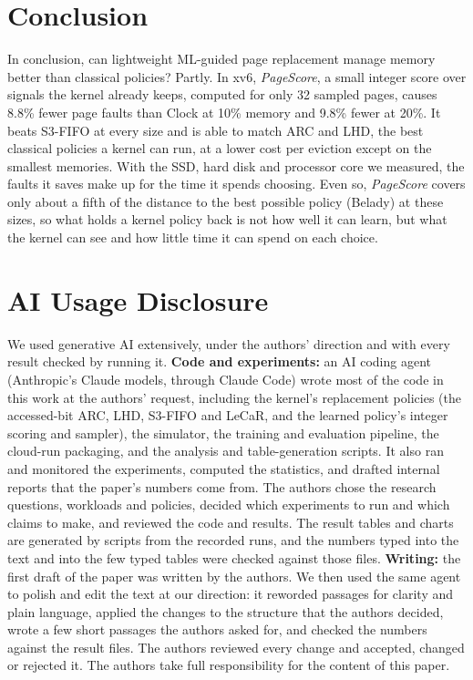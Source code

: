 \documentclass{article}
\newcommand{\clock}{Clock\xspace}
\newcommand{\belady}{Belady\xspace}
\DeclareRobustCommand{\pagescore}{\textit{PageScore}}
\begin{document}
\section{Conclusion}
\label{sec:conclusion}

In conclusion, can lightweight ML-guided page replacement manage memory better than classical policies? Partly. In xv6, \pagescore{}, a small integer score over signals the kernel already keeps, computed for only 32 sampled pages, causes 8.8\% fewer page faults than \clock at 10\% memory and 9.8\% fewer at 20\%. It beats S3-FIFO at every size and is able to match ARC and LHD, the best classical policies a kernel can run, at a lower cost per eviction except on the smallest memories. With the SSD, hard disk and processor core we measured, the faults it saves make up for the time it spends choosing. Even so, \pagescore{} covers only about a fifth of the distance to the best possible policy (\belady) at these sizes, so what holds a kernel policy back is not how well it can learn, but what the kernel can see and how little time it can spend on each choice.
\label{sec:end-of-main}%




\section*{AI Usage Disclosure}

We used generative AI extensively, under the authors' direction and with every result checked by running it. \textbf{Code and experiments:} an AI coding agent (Anthropic's Claude models, through Claude Code) wrote most of the code in this work at the authors' request, including the kernel's replacement policies (the accessed-bit ARC, LHD, S3-FIFO and LeCaR, and the learned policy's integer scoring and sampler), the simulator, the training and evaluation pipeline, the cloud-run packaging, and the analysis and table-generation scripts. It also ran and monitored the experiments, computed the statistics, and drafted internal reports that the paper's numbers come from. The authors chose the research questions, workloads and policies, decided which experiments to run and which claims to make, and reviewed the code and results. The result tables and charts are generated by scripts from the recorded runs, and the numbers typed into the text and into the few typed tables were checked against those files. \textbf{Writing:} the first draft of the paper was written by the authors. We then used the same agent to polish and edit the text at our direction: it reworded passages for clarity and plain language, applied the changes to the structure that the authors decided, wrote a few short passages the authors asked for, and checked the numbers against the result files. The authors reviewed every change and accepted, changed or rejected it. The authors take full responsibility for the content of this paper.
\end{document}
